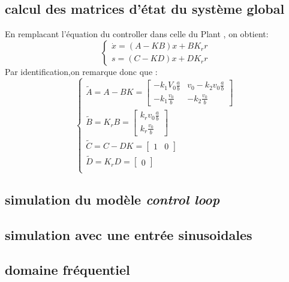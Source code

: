 \documentclass[11pt,a4paper]{article}
\begin{document}
\subsection{calcul des matrices d'état du système global}
En remplacant l'équation du controller dans celle du Plant , on obtient:
\begin{equation}
	\begin{cases}
		\dot x= (A-KB)x+BK_rr \\
		s= (C-KD)x+DK_rr
	\end{cases}
\end{equation}
Par identification,on remarque donc que : \\
\begin{equation}
	\begin{cases}
		\tilde{A} = A-BK= \begin{bmatrix} - k_1 V_0 \frac ab & v_0 - k_2v_0 \frac ab \\ -k_1 \frac {v_0} b & -k_2 \frac{v_0}b \end{bmatrix} \\
		\tilde{B} = K_rB= \begin{bmatrix} k_r v_0 \frac ab \\  k_r \frac{v_0}b \end{bmatrix}                                                \\
		\tilde{C} = C-DK= \begin{bmatrix} 1 & 0  \end{bmatrix}                                                                              \\
		\tilde{D} = K_rD = \begin{bmatrix}  0  \end{bmatrix}                                                                                \\
	\end{cases}
\end{equation}
\subsection{simulation du modèle \textit{control loop}}
\subsection{simulation avec une entrée sinusoidales}
\subsection{domaine fréquentiel}
\end{document}
